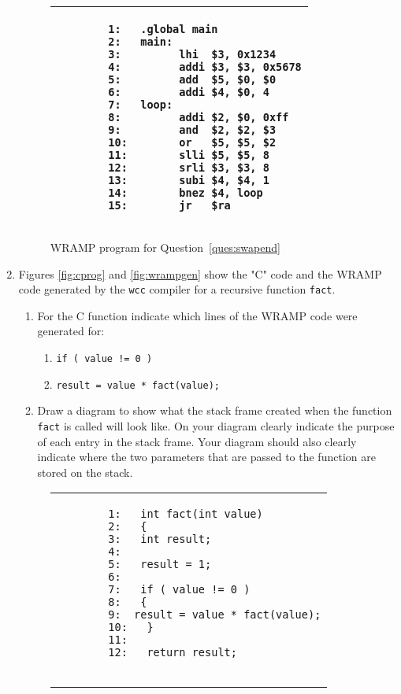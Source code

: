 \documentclass[a4paper,10pt]{article}
\begin{document}
\begin{enumerate}
\begin{figure}[htb]
\begin{footnotesize}
\begin{center}
\begin{tabular}{|p{10cm}|}
\hline
\begin{verbatim}
        1:   .global main
        2:   main:
        3:         lhi  $3, 0x1234
        4:         addi $3, $3, 0x5678
        5:         add  $5, $0, $0
        6:         addi $4, $0, 4
        7:   loop:    
        8:         addi $2, $0, 0xff
        9:         and  $2, $2, $3
        10:        or   $5, $5, $2
        11:        slli $5, $5, 8
        12:        srli $3, $3, 8
        13:        subi $4, $4, 1
        14:        bnez $4, loop
        15:        jr   $ra
\end{verbatim}
\\
\hline
\end{tabular}
\end{center}
\end{footnotesize}
\caption{WRAMP program for Question~\ref{ques:swapend}}
\label{fig:swapend}
\end{figure}
\vspace{2cm}
\item 
\label{ques:cprog}
Figures \ref{fig:cprog} and \ref{fig:wrampgen} show the "C" code and
the WRAMP code generated by the \texttt{wcc} compiler for a recursive
function \verb+fact+. 

\begin{enumerate}
  \item For the C function indicate which lines of the WRAMP code were
  generated for:
  \begin{enumerate}
   \item \verb+if ( value != 0 )+
   \item \verb+result = value * fact(value);+
  \end{enumerate}


  \item Draw a diagram to show what the stack frame created when the
  function \verb+fact+ is called will look like. On your
  diagram clearly indicate the purpose of each entry in the stack
  frame. Your diagram should also clearly indicate where the two
  parameters that are passed to the function are stored on the stack.
\end{enumerate}

\begin{figure}[htb]
\begin{footnotesize}
\begin{center}
\begin{tabular}{|p{10cm}|}
\hline
\begin{verbatim}
        1:   int fact(int value)
       	2:   {
        3:   int result;
        4:
        5:   result = 1;
        6:   
        7:   if ( value != 0 ) 
        8:   {
        9:	result = value * fact(value);
        10:   }
        11:
        12:   return result;


\end{verbatim}
\end{tabular}
\end{center}
\end{footnotesize}
\end{figure}
\end{enumerate}
\end{document}

